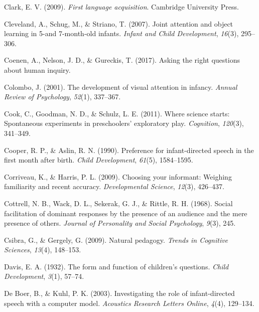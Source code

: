 \documentclass[oneside]{report}
\begin{document}
\leavevmode\hypertarget{ref-clark2009first}{}%
Clark, E. V. (2009). \emph{First language acquisition}. Cambridge
University Press.

\leavevmode\hypertarget{ref-cleveland2007joint}{}%
Cleveland, A., Schug, M., \& Striano, T. (2007). Joint attention and
object learning in 5-and 7-month-old infants. \emph{Infant and Child
Development}, \emph{16}(3), 295--306.

\leavevmode\hypertarget{ref-coenen2017asking}{}%
Coenen, A., Nelson, J. D., \& Gureckis, T. (2017). Asking the right
questions about human inquiry.

\leavevmode\hypertarget{ref-colombo2001development}{}%
Colombo, J. (2001). The development of visual attention in infancy.
\emph{Annual Review of Psychology}, \emph{52}(1), 337--367.

\leavevmode\hypertarget{ref-cook2011science}{}%
Cook, C., Goodman, N. D., \& Schulz, L. E. (2011). Where science starts:
Spontaneous experiments in preschoolers' exploratory play.
\emph{Cognition}, \emph{120}(3), 341--349.

\leavevmode\hypertarget{ref-cooper1990preference}{}%
Cooper, R. P., \& Aslin, R. N. (1990). Preference for infant-directed
speech in the first month after birth. \emph{Child Development},
\emph{61}(5), 1584--1595.

\leavevmode\hypertarget{ref-corriveau2009choosing}{}%
Corriveau, K., \& Harris, P. L. (2009). Choosing your informant:
Weighing familiarity and recent accuracy. \emph{Developmental Science},
\emph{12}(3), 426--437.

\leavevmode\hypertarget{ref-cottrell1968social}{}%
Cottrell, N. B., Wack, D. L., Sekerak, G. J., \& Rittle, R. H. (1968).
Social facilitation of dominant responses by the presence of an audience
and the mere presence of others. \emph{Journal of Personality and Social
Psychology}, \emph{9}(3), 245.

\leavevmode\hypertarget{ref-csibra2009natural}{}%
Csibra, G., \& Gergely, G. (2009). Natural pedagogy. \emph{Trends in
Cognitive Sciences}, \emph{13}(4), 148--153.

\leavevmode\hypertarget{ref-davis1932form}{}%
Davis, E. A. (1932). The form and function of children's questions.
\emph{Child Development}, \emph{3}(1), 57--74.

\leavevmode\hypertarget{ref-de2003investigating}{}%
De Boer, B., \& Kuhl, P. K. (2003). Investigating the role of
infant-directed speech with a computer model. \emph{Acoustics Research
Letters Online}, \emph{4}(4), 129--134.
\end{document}
